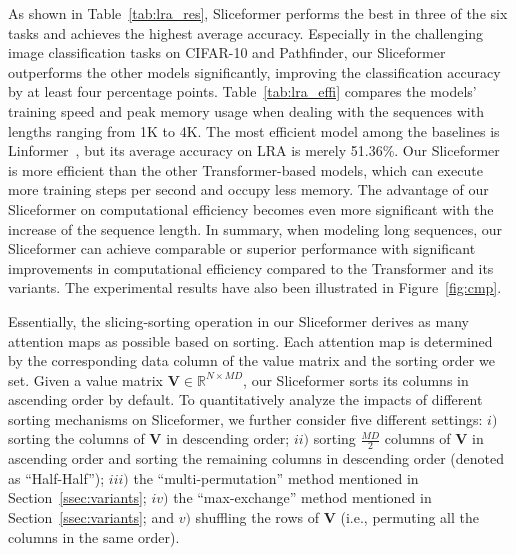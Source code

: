As shown in Table~\ref{tab:lra_res}, Sliceformer performs the best in three of the six tasks and achieves the highest average accuracy. 
Especially in the challenging image classification tasks on CIFAR-10 and Pathfinder, our Sliceformer outperforms the other models significantly, improving the classification accuracy by at least four percentage points.
Table~\ref{tab:lra_effi} compares the models' training speed and peak memory usage when dealing with the sequences with lengths ranging from 1K to 4K. 
The most efficient model among the baselines is Linformer~\cite{wang2020linformer}, but its average accuracy on LRA is merely 51.36\%. 
Our Sliceformer is more efficient than the other Transformer-based models, which can execute more training steps per second and occupy less memory. 
The advantage of our Sliceformer on computational efficiency becomes even more significant with the increase of the sequence length.  
In summary, when modeling long sequences, our Sliceformer can achieve comparable or superior performance with significant improvements in computational efficiency compared to the Transformer and its variants. 
The experimental results have also been illustrated in Figure~\ref{fig:cmp}.

Essentially, the slicing-sorting operation in our Sliceformer derives as many attention maps as possible based on sorting. 
Each attention map is determined by the corresponding data column of the value matrix and the sorting order we set. 
Given a value matrix $\bm{V}\in\mathbb{R}^{N\times MD}$, our Sliceformer sorts its columns in ascending order by default. 
To quantitatively analyze the impacts of different sorting mechanisms on Sliceformer, we further consider five different settings: $i)$ sorting the columns of $\bm{V}$ in descending order; $ii)$ sorting $\frac{MD}{2}$ columns of $\bm{V}$ in ascending order and sorting the remaining columns in descending order (denoted as ``Half-Half''); $iii)$ the ``multi-permutation'' method mentioned in Section~\ref{ssec:variants}; $iv)$ the ``max-exchange'' method mentioned in Section~\ref{ssec:variants}; and $v)$ shuffling the rows of $\bm{V}$ (i.e., permuting all the columns in the same order).

